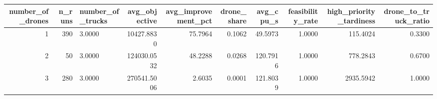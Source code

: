 \begin{tabular}{rrlrrrrrrr}
\toprule
number_of_drones & n_runs & number_of_trucks & avg_objective & avg_improvement_pct & drone_share & avg_cpu_s & feasibility_rate & high_priority_tardiness & drone_to_truck_ratio \\
\midrule
1 & 390 & 3.0000 & 10427.8830 & 75.7964 & 0.1062 & 49.5973 & 1.0000 & 115.4024 & 0.3300 \\
2 & 50 & 3.0000 & 124030.0532 & 48.2288 & 0.0268 & 120.7916 & 1.0000 & 778.2843 & 0.6700 \\
3 & 280 & 3.0000 & 270541.5006 & 2.6035 & 0.0001 & 121.8039 & 1.0000 & 2935.5942 & 1.0000 \\
\bottomrule
\end{tabular}
